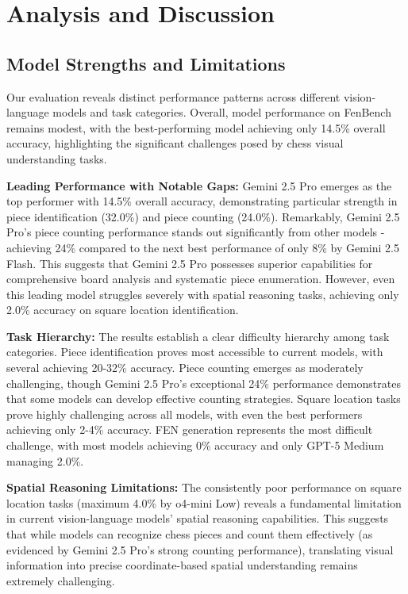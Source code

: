 \documentclass{article}
\begin{document}
\section{Analysis and Discussion}

\subsection{Model Strengths and Limitations}

Our evaluation reveals distinct performance patterns across different vision-language models and task categories. Overall, model performance on FenBench remains modest, with the best-performing model achieving only 14.5\% overall accuracy, highlighting the significant challenges posed by chess visual understanding tasks.

\textbf{Leading Performance with Notable Gaps:} Gemini 2.5 Pro emerges as the top performer with 14.5\% overall accuracy, demonstrating particular strength in piece identification (32.0\%) and piece counting (24.0\%). Remarkably, Gemini 2.5 Pro's piece counting performance stands out significantly from other models - achieving 24\% compared to the next best performance of only 8\% by Gemini 2.5 Flash. This suggests that Gemini 2.5 Pro possesses superior capabilities for comprehensive board analysis and systematic piece enumeration. However, even this leading model struggles severely with spatial reasoning tasks, achieving only 2.0\% accuracy on square location identification.

\textbf{Task Hierarchy:} The results establish a clear difficulty hierarchy among task categories. Piece identification proves most accessible to current models, with several achieving 20-32\% accuracy. Piece counting emerges as moderately challenging, though Gemini 2.5 Pro's exceptional 24\% performance demonstrates that some models can develop effective counting strategies. Square location tasks prove highly challenging across all models, with even the best performers achieving only 2-4\% accuracy. FEN generation represents the most difficult challenge, with most models achieving 0\% accuracy and only GPT-5 Medium managing 2.0\%.

\textbf{Spatial Reasoning Limitations:} The consistently poor performance on square location tasks (maximum 4.0\% by o4-mini Low) reveals a fundamental limitation in current vision-language models' spatial reasoning capabilities. This suggests that while models can recognize chess pieces and count them effectively (as evidenced by Gemini 2.5 Pro's strong counting performance), translating visual information into precise coordinate-based spatial understanding remains extremely challenging.
\end{document}
